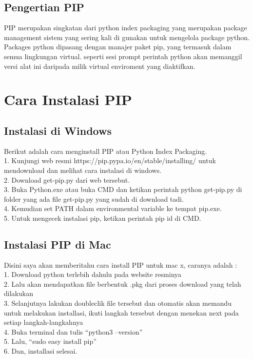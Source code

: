 \documentclass[12pt,a4paper]{article}
\begin{document}
\subsection{Pengertian PIP}
PIP merupakan singkatan dari python index packaging yang merupakan package management sistem yang sering kali di gunakan untuk mengelola package python. Packages python dipasang dengan manajer paket pip, yang termasuk dalam semua lingkungan virtual. seperti sesi prompt perintah python akan memanggil versi alat ini daripada milik virtual enviroment yang diaktifkan.

\section{Cara Instalasi PIP}
\subsection{Instalasi di Windows}
Berikut adalah cara menginstall PIP atau Python Index Packaging. \\
1.	Kunjungi web resmi https://pip.pypa.io/en/stable/installing/ untuk mendownload dan melihat cara instalasi di windows.\\
2.	Download get-pip.py dari web tersebut. \\
3.	Buka Python.exe atau buka CMD dan ketikan perintah python get-pip.py di folder yang ada file get-pip.py yang sudah di 	download tadi.\\
4.	Kemudian set PATH dalam environmental variable ke tempat pip.exe. \\
5.	Untuk mengecek instalasi pip, ketikan perintah pip id di CMD. \\
\subsection{Instalasi PIP di Mac}
Disini saya akan memberitahu cara install PIP untuk mac x, caranya adalah : \\
1.	Download python terlebih dahulu pada website resminya \\
2.	Lalu akan mendapatkan file berbentuk .pkg  dari proses download yang telah dilakukan \\
3.	Selanjutnya lakukan doubleclik file tersebut dan otomatis akan memandu untuk melakukan installasi, ikuti langkah tersebut dengan menekan next pada setiap langkah-langkahnya \\
4.	Buka terminal dan tulis “python3 –version” \\
5.	Lalu, “sudo easy install pip” \\
6.	Dan, installasi selesai. \\
\end{document}
